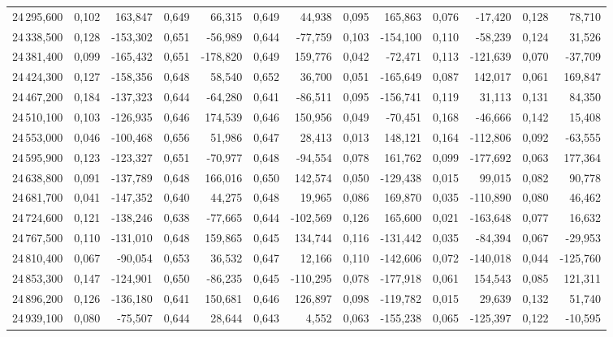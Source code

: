 \begin{longtable}{rrrrrrrrrrrrr}
24\,295,600 & 0,102 & 163,847 & 0,649 & 66,315 & 0,649 & 44,938 & 0,095 & 165,863 & 0,076 & -17,420 & 0,128 & 78,710\\
24\,338,500 & 0,128 & -153,302 & 0,651 & -56,989 & 0,644 & -77,759 & 0,103 & -154,100 & 0,110 & -58,239 & 0,124 & 31,526\\
24\,381,400 & 0,099 & -165,432 & 0,651 & -178,820 & 0,649 & 159,776 & 0,042 & -72,471 & 0,113 & -121,639 & 0,070 & -37,709\\
24\,424,300 & 0,127 & -158,356 & 0,648 & 58,540 & 0,652 & 36,700 & 0,051 & -165,649 & 0,087 & 142,017 & 0,061 & 169,847\\
24\,467,200 & 0,184 & -137,323 & 0,644 & -64,280 & 0,641 & -86,511 & 0,095 & -156,741 & 0,119 & 31,113 & 0,131 & 84,350\\
24\,510,100 & 0,103 & -126,935 & 0,646 & 174,539 & 0,646 & 150,956 & 0,049 & -70,451 & 0,168 & -46,666 & 0,142 & 15,408\\
24\,553,000 & 0,046 & -100,468 & 0,656 & 51,986 & 0,647 & 28,413 & 0,013 & 148,121 & 0,164 & -112,806 & 0,092 & -63,555\\
24\,595,900 & 0,123 & -123,327 & 0,651 & -70,977 & 0,648 & -94,554 & 0,078 & 161,762 & 0,099 & -177,692 & 0,063 & 177,364\\
24\,638,800 & 0,091 & -137,789 & 0,648 & 166,016 & 0,650 & 142,574 & 0,050 & -129,438 & 0,015 & 99,015 & 0,082 & 90,778\\
24\,681,700 & 0,041 & -147,352 & 0,640 & 44,275 & 0,648 & 19,965 & 0,086 & 169,870 & 0,035 & -110,890 & 0,080 & 46,462\\
24\,724,600 & 0,121 & -138,246 & 0,638 & -77,665 & 0,644 & -102,569 & 0,126 & 165,600 & 0,021 & -163,648 & 0,077 & 16,632\\
24\,767,500 & 0,110 & -131,010 & 0,648 & 159,865 & 0,645 & 134,744 & 0,116 & -131,442 & 0,035 & -84,394 & 0,067 & -29,953\\
24\,810,400 & 0,067 & -90,054 & 0,653 & 36,532 & 0,647 & 12,166 & 0,110 & -142,606 & 0,072 & -140,018 & 0,044 & -125,760\\
24\,853,300 & 0,147 & -124,901 & 0,650 & -86,235 & 0,645 & -110,295 & 0,078 & -177,918 & 0,061 & 154,543 & 0,085 & 121,311\\
24\,896,200 & 0,126 & -136,180 & 0,641 & 150,681 & 0,646 & 126,897 & 0,098 & -119,782 & 0,015 & 29,639 & 0,132 & 51,740\\
24\,939,100 & 0,080 & -75,507 & 0,644 & 28,644 & 0,643 & 4,552 & 0,063 & -155,238 & 0,065 & -125,397 & 0,122 & -10,595\\

\end{longtable}
